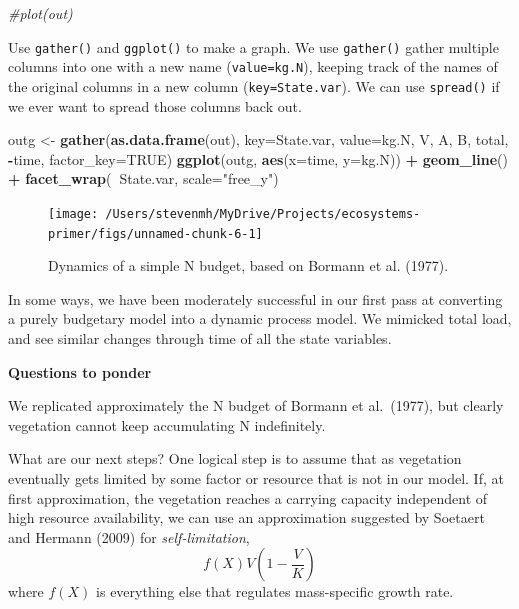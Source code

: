 \documentclass[
]{book}
\newenvironment{Shaded}{\begin{snugshade}}{\end{snugshade}}
\newcommand{\CommentTok}[1]{\textcolor[rgb]{0.56,0.35,0.01}{\textit{#1}}}
\newcommand{\DataTypeTok}[1]{\textcolor[rgb]{0.13,0.29,0.53}{#1}}
\newcommand{\KeywordTok}[1]{\textcolor[rgb]{0.13,0.29,0.53}{\textbf{#1}}}
\newcommand{\NormalTok}[1]{#1}
\newcommand{\OperatorTok}[1]{\textcolor[rgb]{0.81,0.36,0.00}{\textbf{#1}}}
\newcommand{\OtherTok}[1]{\textcolor[rgb]{0.56,0.35,0.01}{#1}}
\newcommand{\StringTok}[1]{\textcolor[rgb]{0.31,0.60,0.02}{#1}}
\begin{document}
\begin{Shaded}
\begin{Highlighting}[]
\CommentTok{#plot(out)}
\end{Highlighting}
\end{Shaded}

Use \texttt{gather()} and \texttt{ggplot()} to make a graph. We use \texttt{gather()} gather multiple columns into one with a new name (\texttt{value=kg.N}), keeping track of the names of the original columns in a new column (\texttt{key=State.var}). We can use \texttt{spread()} if we ever want to spread those columns back out.

\begin{Shaded}
\begin{Highlighting}[]
\NormalTok{outg <-}\StringTok{ }\KeywordTok{gather}\NormalTok{(}\KeywordTok{as.data.frame}\NormalTok{(out), }\DataTypeTok{key=}\NormalTok{State.var, }\DataTypeTok{value=}\NormalTok{kg.N, }
\NormalTok{              V, A, B, total, }\OperatorTok{-}\NormalTok{time,}
              \DataTypeTok{factor_key=}\OtherTok{TRUE}\NormalTok{)}
\KeywordTok{ggplot}\NormalTok{(outg, }\KeywordTok{aes}\NormalTok{(}\DataTypeTok{x=}\NormalTok{time, }\DataTypeTok{y=}\NormalTok{kg.N)) }\OperatorTok{+}\StringTok{ }\KeywordTok{geom_line}\NormalTok{() }\OperatorTok{+}\StringTok{ }\KeywordTok{facet_wrap}\NormalTok{(}\OperatorTok{~}\NormalTok{State.var, }\DataTypeTok{scale=}\StringTok{"free_y"}\NormalTok{)}
\end{Highlighting}
\end{Shaded}

\begin{figure}
\texttt{[image: /Users/stevenmh/MyDrive/Projects/ecosystems-primer/figs/unnamed-chunk-6-1]} \caption{Dynamics of a simple N budget, based on Bormann et al. (1977).}\label{fig:unnamed-chunk-6}
\end{figure}

In some ways, we have been moderately successful in our first pass at
converting a purely budgetary model into a dynamic process model. We
mimicked total load, and see similar changes through time of all the
state variables.

\textbf{Questions to ponder}

We replicated approximately the N budget of Bormann et al.~(1977), but
clearly vegetation cannot keep accumulating N indefinitely.

What are our next steps? One logical step is to assume that as vegetation eventually gets limited by some factor or resource that is not in our model. If, at first approximation, the vegetation reaches a carrying capacity independent of high resource availability, we can use an approximation suggested by Soetaert and Hermann (2009) for \emph{self-limitation},
\[f(X)V\left(1-\frac{V}{K}\right)\]
where \(f(X)\) is everything else that regulates mass-specific growth rate.
\end{document}
